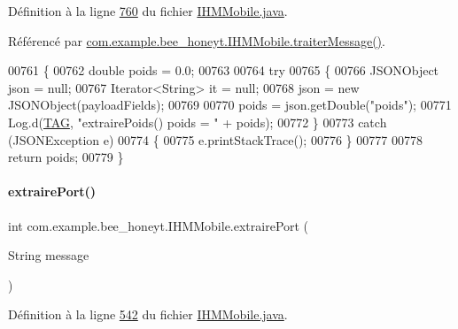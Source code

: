 Définition à la ligne \hyperlink{_i_h_m_mobile_8java_source_l00760}{760} du fichier \hyperlink{_i_h_m_mobile_8java_source}{I\+H\+M\+Mobile.\+java}.



Référencé par \hyperlink{_i_h_m_mobile_8java_source_l00374}{com.\+example.\+bee\+\_\+honeyt.\+I\+H\+M\+Mobile.\+traiter\+Message()}.


\begin{DoxyCode}
00761     \{
00762         \textcolor{keywordtype}{double} poids = 0.0;
00763 
00764         \textcolor{keywordflow}{try}
00765         \{
00766             JSONObject json = null;
00767             Iterator<String> it = null;
00768             json = \textcolor{keyword}{new} JSONObject(payloadFields);
00769 
00770             poids = json.getDouble(\textcolor{stringliteral}{"poids"});
00771             Log.d(\hyperlink{classcom_1_1example_1_1bee__honeyt_1_1_i_h_m_mobile_a366987bf9bb2ed1010b2f967d4efa263}{TAG}, \textcolor{stringliteral}{"extrairePoids() poids = "} + poids);
00772         \}
00773         \textcolor{keywordflow}{catch} (JSONException e)
00774         \{
00775             e.printStackTrace();
00776         \}
00777 
00778         \textcolor{keywordflow}{return} poids;
00779     \}
\end{DoxyCode}
\mbox{\label{classcom_1_1example_1_1bee__honeyt_1_1_i_h_m_mobile_abc4571bc8b1400c6d75c0a2594b0abe6}} 
\paragraph{\texorpdfstring{extraire\+Port()}{extrairePort()}}
{\footnotesize\ttfamily int com.\+example.\+bee\+\_\+honeyt.\+I\+H\+M\+Mobile.\+extraire\+Port (\begin{DoxyParamCaption}\item[{String}]{message }\end{DoxyParamCaption})\hspace{0.3cm}{\ttfamily [private]}}



Définition à la ligne \hyperlink{_i_h_m_mobile_8java_source_l00542}{542} du fichier \hyperlink{_i_h_m_mobile_8java_source}{I\+H\+M\+Mobile.\+java}.



